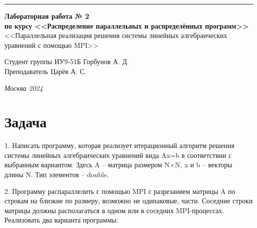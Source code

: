 \documentclass[a4paper, 14pt]{extarticle}
\begin{document}
\begin{titlepage}
\vspace*{-16pt}
\hspace{30pt}\rule{0.866\textwidth}{0.4pt}
  
\vspace{11em}

\begin{center}
\Large {\bf Лабораторная работа № 2} \\ 
\large {\bf по курсу <<Распределение параллельных и распределённых программ>>}\\
\large <<Параллельная реализация решения системы линейных алгебраических уравнений с помощью MPI>>
\end{center}\normalsize

\vspace{8em}


\begin{flushright}
  {Студент группы ИУ9-51Б Горбунов А. Д.\hspace*{15pt} \\
  \vspace{2ex}
  Преподаватель Царёв А. С.\hspace*{15pt}}
\end{flushright}

\bigskip

\vfill
 

\begin{center}
\textsl{Москва 2024}
\end{center}
\end{titlepage}

\renewcommand{\ttdefault}{pcr}

\setlength{\tabcolsep}{3pt}
\newpage
\setcounter{page}{2}

\section{Задача}\label{Sect::task}
\par
    1. Написать программу, которая реализует итерационный алгоритм решения системы линейных алгебраических уравнений вида Ax=b в соответствии с выбранным вариантом. Здесь A – матрица размером N×N, x и b – векторы длины N. Тип элементов – double.

    
    2. Программу распараллелить с помощью MPI с разрезанием матрицы A по строкам на близкие по размеру, возможно не одинаковые, части. Соседние строки матрицы должны располагаться в одном или в соседних MPI-процессах. Реализовать два варианта программы:
\end{document}
